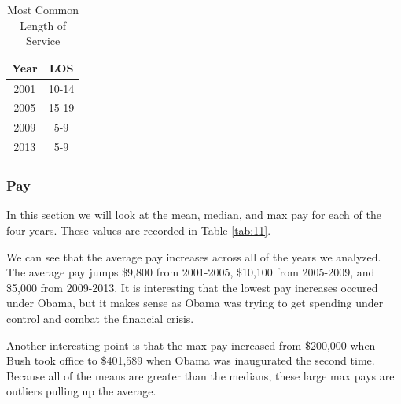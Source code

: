 \documentclass{article}
\begin{document}
            \begin{center}
                \begin{table}
                    \centering
                    \begin{tabular}{ |c|c| }
                        \hline
                        Year & LOS \\
                        \hline
                        2001 & 10-14 \\
                        2005 & 15-19 \\
                        2009 & 5-9 \\
                        2013 & 5-9 \\
                        \hline
                    \end{tabular}
                    \caption{Most Common Length of Service}
                    \label{tab:10}
                \end{table}
            \end{center}

        \subsubsection{Pay}
        In this section we will look at the mean, median, and max pay for each of the four years. These values are recorded in Table \ref{tab:11}.
        \par
        We can see that the average pay increases across all of the years we analyzed. The average pay jumps \$9,800 from 2001-2005, \$10,100 from 2005-2009, and \$5,000 from 2009-2013. It is interesting that the lowest pay increases occured under Obama, but it makes sense as Obama was trying to get spending under control and combat the financial crisis.
        \par
        Another interesting point is that the max pay increased from \$200,000 when Bush took office to \$401,589 when Obama was inaugurated the second time. Because all of the means are greater than the medians, these large max pays are outliers pulling up the average.
\end{document}
